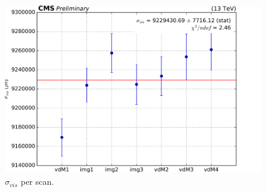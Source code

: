 \begin{center}
  \begin{figure}[ht]
    \centering
    \includegraphics[scale=0.37]{Chapter4/plots/xsec_perscan_v2.png}
    \caption[$\sigma_{vis}$ per Scan]{ $\sigma_{vis}$  per scan.} %
    \label{sigmavis_perscan}
  \end{figure}
\end{center}
